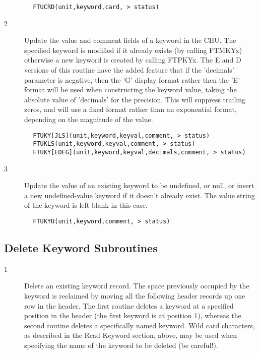 \documentclass[11pt]{book}
\begin{document}
\begin{verbatim}
        FTUCRD(unit,keyword,card, > status)
\end{verbatim}

\begin{description}
\item[2 ] Update the value and comment fields of a keyword in the CHU.
    The specified keyword is modified if it already exists (by calling
    FTMKYx) otherwise a new keyword is created by calling FTPKYx.
     The E and D versions of this routine have the added feature that
     if the 'decimals' parameter is negative, then the 'G' display
     format rather then the 'E' format will be used when constructing
     the keyword value, taking the absolute value of 'decimals' for the
     precision.  This will suppress trailing zeros, and will use a
     fixed format rather than an exponential format,
    depending on the magnitude of the value.
\end{description}

\begin{verbatim}
        FTUKY[JLS](unit,keyword,keyval,comment, > status)
        FTUKLS(unit,keyword,keyval,comment, > status)
        FTUKY[EDFG](unit,keyword,keyval,decimals,comment, > status)
\end{verbatim}

\begin{description}
\item[3 ] Update the value of an existing keyword to be undefined, or null,
    or insert a new undefined-value keyword if it doesn't already exist.
   The value string of the keyword is left blank in this case.
\end{description}

\begin{verbatim}
        FTUKYU(unit,keyword,comment, > status)
\end{verbatim}

\subsection{Delete Keyword Subroutines \label{FTDREC}}


\begin{description}
\item[1 ] Delete an existing keyword record.  The space previously occupied by
    the keyword is reclaimed by moving all the following header records up
    one row in the header.  The first routine deletes a keyword at a
    specified position in the header (the first keyword is at position 1),
    whereas the second routine deletes a specifically named keyword.
    Wild card characters, as described in the Read Keyword section, above,
    may be used when specifying the name of the keyword to be deleted
   (be careful!).
\end{description}
\end{document}
